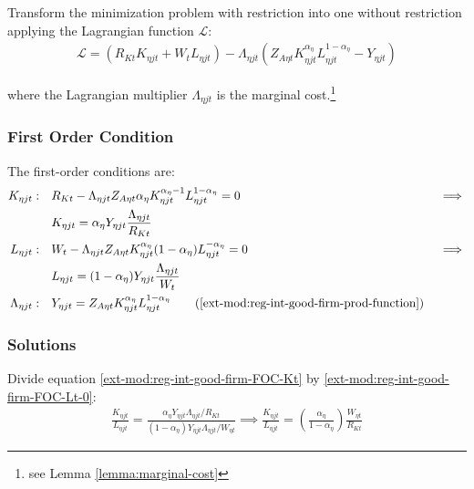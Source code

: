 \documentclass[../thesis.tex]{subfiles}
\begin{document}
Transform the minimization problem with restriction into one without restriction applying the Lagrangian function $\mathcal{L}$:
\begin{align}
	\label{ext-mod:reg-int-good-firm-lagrangian}
	\mathcal{L} = (R_{Kt} K_{\eta jt} + W_t L_{\eta jt}) - \Lambda_{\eta jt} (Z_{A\eta t} K_{\eta jt}^{\alpha_{\eta}} L_{\eta jt}^{1-{\alpha_{\eta}}} - Y_{\eta jt})
\end{align}

where the Lagrangian multiplier $\Lambda_{\eta jt}$ is the marginal cost.\footnote{see Lemma \ref{lemma:marginal-cost}}

\subsubsection*{First Order Condition}

The first-order conditions are:
\begin{alignat}{2}
	K_{\eta jt}: \quad & R_{Kt} - \Lambda_{\eta jt} Z_{A\eta t} {\alpha_{\eta}} K_{\eta jt}^{{\alpha_{\eta}}-1} L_{\eta jt}^{1-{\alpha_{\eta}}} = 0 &&\implies \nonumber \\
	& K_{\eta jt} = {\alpha_{\eta}} Y_{\eta jt} \frac{\Lambda_{\eta jt}}{R_{Kt}} \label{ext-mod:reg-int-good-firm-FOC-Kt} \\
	L_{\eta jt}: \quad & W_t - \Lambda_{\eta jt} Z_{A\eta t} K_{\eta jt}^{\alpha_{\eta}} (1-{\alpha_{\eta}}) L_{\eta jt}^{-{\alpha_{\eta}}} = 0 \quad &&\implies \nonumber \\ 
	& L_{\eta jt} = (1-{\alpha_{\eta}}) Y_{\eta jt} \frac{\Lambda_{\eta jt}}{W_t} \label{ext-mod:reg-int-good-firm-FOC-Lt-0} \\
	\Lambda_{\eta jt}: \quad & Y_{\eta jt} = Z_{A\eta t} K_{\eta jt}^{\alpha_{\eta}} L_{\eta jt}^{1-{\alpha_{\eta}}} \tag{\ref{ext-mod:reg-int-good-firm-prod-function}}
\end{alignat}

\subsubsection*{Solutions}

Divide equation \ref{ext-mod:reg-int-good-firm-FOC-Kt} by \ref{ext-mod:reg-int-good-firm-FOC-Lt-0}:
\begin{align}
	\frac{K_{\eta jt}}{L_{\eta jt}} = \frac{{\alpha_{\eta}} Y_{\eta jt} \Lambda_{\eta jt} /R_{Kt}}{(1-\alpha_{\eta}) Y_{\eta jt} \Lambda_{\eta jt} /W_{\eta t}} \implies
	\frac{K_{\eta jt}}{L_{\eta jt}} = \left( \frac{{\alpha_{\eta}}}{1-\alpha_{\eta}} \right) \frac{W_{\eta t}}{R_{Kt}} \label{ext-mod:reg-int-good-firm-TMRS}
\end{align}
\end{document}
